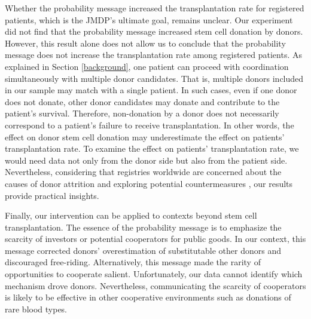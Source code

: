 \documentclass[12pt, a4paper]{article}
\begin{document}
Whether the probability message increased the transplantation rate for registered patients, which is the JMDP's ultimate goal, remains unclear. Our experiment did not find that the probability message increased stem cell donation by donors. However, this result alone does not allow us to conclude that the probability message does not increase the transplantation rate among registered patients. As explained in Section \ref{background}, one patient can proceed with coordination simultaneously with multiple donor candidates. That is, multiple donors included in our sample may match with a single patient. In such cases, even if one donor does not donate, other donor candidates may donate and contribute to the patient's survival. Therefore, non-donation by a donor does not necessarily correspond to a patient's failure to receive transplantation. In other words, the effect on donor stem cell donation may underestimate the effect on patients' transplantation rate. To examine the effect on patients' transplantation rate, we would need data not only from the donor side but also from the patient side. Nevertheless, considering that registries worldwide are concerned about the causes of donor attrition and exploring potential countermeasures \citep[for example,][]{Switzer2018, Balassa2019, Hamed2023, Haylock2024}, our results provide practical insights.

Finally, our intervention can be applied to contexts beyond stem cell transplantation. The essence of the probability message is to emphasize the scarcity of investors or potential cooperators for public goods. In our context, this message corrected donors' overestimation of substitutable other donors and discouraged free-riding. Alternatively, this message made the rarity of opportunities to cooperate salient. Unfortunately, our data cannot identify which mechanism drove donors. Nevertheless, communicating the scarcity of cooperators is likely to be effective in other cooperative environments such as donations of rare blood types.

\clearpage


\end{document}

